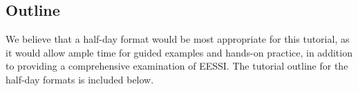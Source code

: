 \subsection*{Outline}

We believe that a half-day format would be most appropriate for this tutorial, as it would allow ample time for guided examples and hands-on practice, in addition to providing a comprehensive examination of EESSI. The tutorial outline for the half-day formats is included below.

% 

